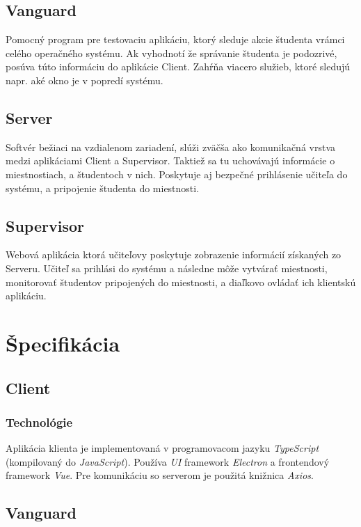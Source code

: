 \documentclass{article}
\begin{document}
\subsection{Vanguard}

Pomocný program pre testovaciu aplikáciu, ktorý sleduje akcie študenta vrámci celého operačného systému. Ak vyhodnotí že správanie študenta je podozrivé, posúva túto informáciu do aplikácie Client. Zahŕňa viacero služieb, ktoré sledujú napr. aké okno je v popredí systému.

\subsection{Server}

Softvér bežiaci na vzdialenom zariadení, slúži zväčša ako komunikačná vrstva medzi aplikáciami Client a Supervisor. Taktiež sa tu uchovávajú informácie o miestnostiach, a študentoch v nich. Poskytuje aj bezpečné prihlásenie učiteľa do systému, a pripojenie študenta do miestnosti.

\subsection{Supervisor}

Webová aplikácia ktorá učiteľovy poskytuje zobrazenie informácií získaných zo Serveru. Učiteľ sa prihlási do systému a následne môže vytvárať miestnosti, monitorovať študentov pripojených do miestnosti, a diaľkovo ovládať ich klientskú aplikáciu.

\section{Špecifikácia}

\subsection{Client}

\subsubsection{Technológie}

Aplikácia klienta je implementovaná v programovacom jazyku \emph{TypeScript} (kompilovaný do \emph{JavaScript}). Používa \emph{UI} framework \emph{Electron} a frontendový framework \emph{Vue}. Pre komunikáciu so serverom je použitá knižnica \emph{Axios}.

\subsection{Vanguard}
\end{document}
